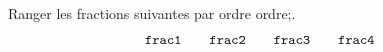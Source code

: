 \documentclass[exercice]{thedocument}%
\begin{document}
%
Ranger les fractions suivantes par ordre \<ordre;.
$$\<frac1;\qquad\<frac2;\qquad\<frac3;\qquad\<frac4;$$
\end{document}
